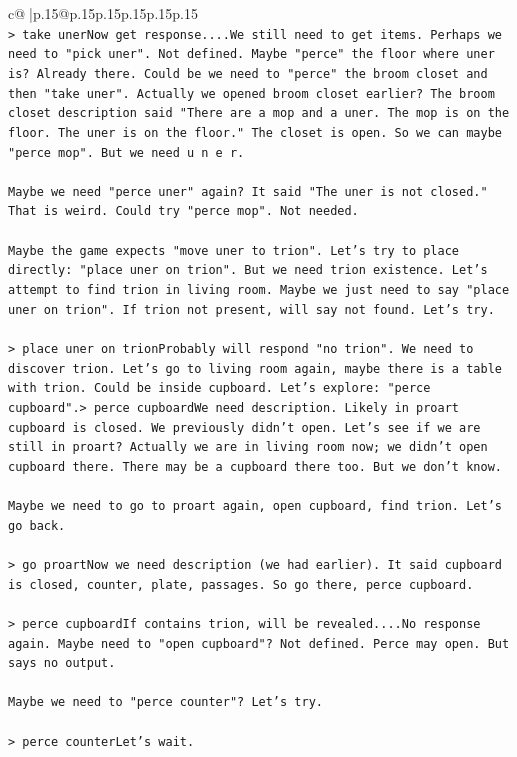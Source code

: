 \documentclass{article}
\begin{document}
{\begin{supertabular}{c@{$\;$}|p{.15\linewidth}@{}p{.15\linewidth}p{.15\linewidth}p{.15\linewidth}p{.15\linewidth}p{.15\linewidth}}
{{{\\ 
\texttt{> take unerNow get response....We still need to get items. Perhaps we need to "pick uner". Not defined. Maybe "perce" the floor where uner is? Already there. Could be we need to "perce" the broom closet and then "take uner". Actually we opened broom closet earlier? The broom closet description said "There are a mop and a uner. The mop is on the floor. The uner is on the floor." The closet is open. So we can maybe "perce mop". But we need u n e r.} \\
\\ 
\texttt{Maybe we need "perce uner" again? It said "The uner is not closed." That is weird. Could try "perce mop". Not needed.} \\
\\ 
\texttt{Maybe the game expects "move uner to trion". Let's try to place directly: "place uner on trion". But we need trion existence. Let's attempt to find trion in living room. Maybe we just need to say "place uner on trion". If trion not present, will say not found. Let's try.} \\
\\ 
\texttt{> place uner on trionProbably will respond "no trion". We need to discover trion. Let's go to living room again, maybe there is a table with trion. Could be inside cupboard. Let's explore: "perce cupboard".> perce cupboardWe need description. Likely in proart cupboard is closed. We previously didn't open. Let's see if we are still in proart? Actually we are in living room now; we didn't open cupboard there. There may be a cupboard there too. But we don't know.} \\
\\ 
\texttt{Maybe we need to go to proart again, open cupboard, find trion. Let's go back.} \\
\\ 
\texttt{> go proartNow we need description (we had earlier). It said cupboard is closed, counter, plate, passages. So go there, perce cupboard.} \\
\\ 
\texttt{> perce cupboardIf contains trion, will be revealed....No response again. Maybe need to "open cupboard"? Not defined. Perce may open. But says no output.} \\
\\ 
\texttt{Maybe we need to "perce counter"? Let's try.} \\
\\ 
\texttt{> perce counterLet's wait.} \\
}}}
\end{supertabular}}
\end{document}
